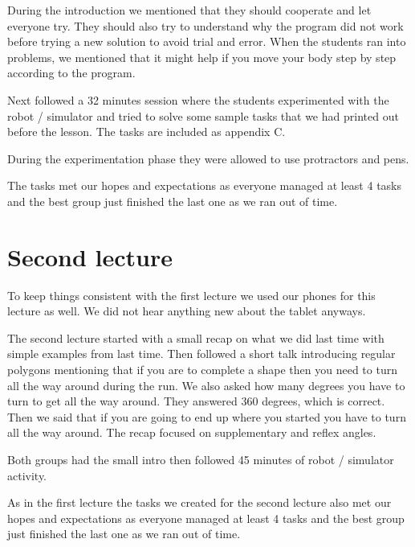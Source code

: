 \bigskip\noindent
During the introduction we mentioned that they should cooperate and let everyone try. They should also try to understand why the program did not work before trying a new solution to avoid trial and error. When the students ran into problems, we mentioned that it might help if you move your body step by step according to the program.

\bigskip\noindent
Next followed a 32 minutes session where the students experimented with the robot / simulator and tried to solve some sample tasks that we had printed out before the lesson. The tasks are included as appendix C.

\bigskip\noindent
During the experimentation phase they were allowed to use protractors and pens. 

\bigskip\noindent
The tasks met our hopes and expectations as everyone managed at least 4 tasks and the best group just finished the last one as we ran out of time. 

\section{Second lecture}
To keep things consistent with the first lecture we used our phones for this lecture as well. We did not hear anything new about the tablet anyways. 

\bigskip\noindent
The second lecture started with a small recap on what we did last time with simple examples from last time. Then followed a short talk introducing regular polygons mentioning that if you are to complete a shape then you need to turn all the way around during the run. We also asked how many degrees you have to turn to get all the way around. They answered 360 degrees, which is correct. Then we said that if you are going to end up where you started you have to turn all the way around. The recap focused on supplementary and reflex angles.

\bigskip\noindent
Both groups had the small intro then followed 45 minutes of robot / simulator activity. 

\bigskip\noindent
As in the first lecture the tasks we created for the second lecture also met our hopes and expectations as everyone managed at least 4 tasks and the best group just finished the last one as we ran out of time. 